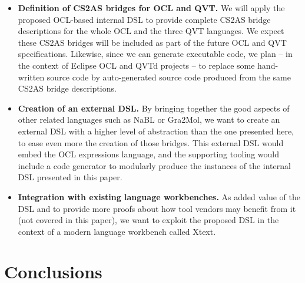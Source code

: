 \documentclass{llncs}
\begin{document}
\begin{itemize}
\item \textbf{Definition of CS2AS bridges for OCL and QVT.} We will apply the proposed OCL-based internal DSL to provide complete CS2AS bridge descriptions for the whole OCL and the three QVT languages. We expect these CS2AS bridges will be included as part of the future OCL and QVT specifications. Likewise, since we can generate executable code, we plan  -- in the context of Eclipse OCL and QVTd projects -- to replace some hand-written source code by auto-generated source code produced from the same CS2AS bridge descriptions.

\item \textbf{Creation of an external DSL.} By bringing together the good aspects of other related languages such as NaBL or Gra2Mol, we want to create an external DSL with a higher level of abstraction than the one presented here, to ease even more the creation of those bridges. This external DSL would embed the OCL expressions language, and the supporting tooling would include a code generator to modularly produce the instances of the internal DSL presented in this paper.

\item \textbf{Integration with existing language workbenches.} As added value of the DSL and to provide more proofs about how tool vendors may benefit from it (not covered in this paper), we want to exploit the proposed DSL in the context of a modern language workbench called Xtext.


\end{itemize}

\section{Conclusions}
\label{sec:conclusions}
\end{document}
